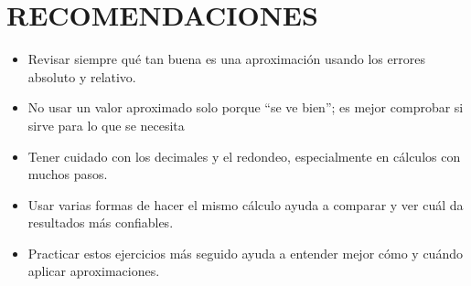 \documentclass[12pt]{article}
\begin{document}
\section*{RECOMENDACIONES}
\begin{itemize}

     \item {Revisar siempre qué tan buena es una aproximación usando los errores absoluto y relativo.}
     \item {No usar un valor aproximado solo porque “se ve bien”; es mejor comprobar si sirve para lo que se necesita}
     \item {Tener cuidado con los decimales y el redondeo, especialmente en cálculos con muchos pasos.}
     \item {Usar varias formas de hacer el mismo cálculo ayuda a comparar y ver cuál da resultados más confiables.}
     \item {Practicar estos ejercicios más seguido ayuda a entender mejor cómo y cuándo aplicar aproximaciones.}
\end{itemize}


\vspace{0.5cm}


\renewcommand{\refname}{\MakeUppercase{REFERENCIAS}}


\end{document}
